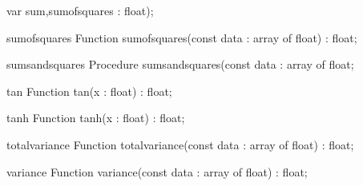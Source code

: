 \FPCexample{}


  var sum,sumofsquares : float);
\begin{function}{sumofsquares}
\Declaration
Function sumofsquares(const data : array of float) : float;
\Description

\Errors
\SeeAlso
\end{function}

\FPCexample{}


\begin{procedure}{sumsandsquares}
\Declaration
Procedure sumsandsquares(const data : array of float;
\Description

\Errors
\SeeAlso
\end{procedure}

\FPCexample{}


\begin{function}{tan}
\Declaration
Function tan(x : float) : float;
\Description

\Errors
\SeeAlso
\end{function}

\FPCexample{}


\begin{function}{tanh}
\Declaration
Function tanh(x : float) : float;
\Description

\Errors
\SeeAlso
\end{function}

\FPCexample{}


\begin{function}{totalvariance}
\Declaration
Function totalvariance(const data : array of float) : float;
\Description

\Errors
\SeeAlso
\end{function}

\FPCexample{}


\begin{function}{variance}
\Declaration
Function variance(const data : array of float) : float;
\Description

\Errors
\SeeAlso
\end{function}

\FPCexample{}
